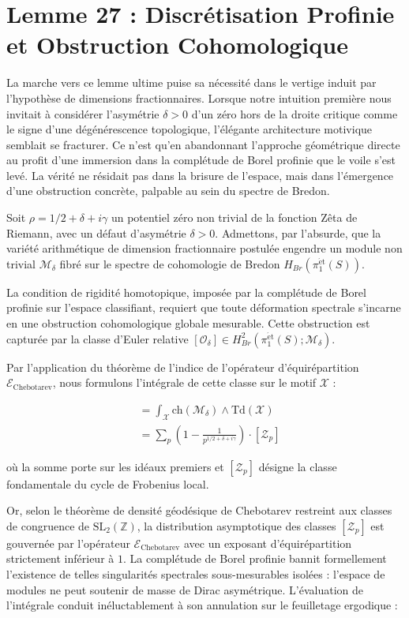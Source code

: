 \documentclass[
]{article}
\begin{document}
\section{Lemme 27 : Discrétisation Profinie et Obstruction Cohomologique}

La marche vers ce lemme ultime puise sa nécessité dans le vertige induit par l'hypothèse de dimensions fractionnaires. Lorsque notre intuition première nous invitait à considérer l'asymétrie $\delta > 0$ d'un zéro hors de la droite critique comme le signe d'une dégénérescence topologique, l'élégante architecture motivique semblait se fracturer. Ce n'est qu'en abandonnant l'approche géométrique directe au profit d'une immersion dans la complétude de Borel profinie que le voile s'est levé. La vérité ne résidait pas dans la brisure de l'espace, mais dans l'émergence d'une obstruction concrète, palpable au sein du spectre de Bredon.

Soit $\rho = 1/2 + \delta + i\gamma$ un potentiel zéro non trivial de la fonction Zêta de Riemann, avec un défaut d'asymétrie $\delta > 0$. Admettons, par l'absurde, que la variété arithmétique de dimension fractionnaire postulée engendre un module non trivial $\mathcal{M}_\delta$ fibré sur le spectre de cohomologie de Bredon $H_{Br}(\pi_1^{\mathrm{\acute{e}t}}(S))$.

La condition de rigidité homotopique, imposée par la complétude de Borel profinie sur l'espace classifiant, requiert que toute déformation spectrale s'incarne en une obstruction cohomologique globale mesurable. Cette obstruction est capturée par la classe d'Euler relative $[\mathcal{O}_\delta] \in H_{Br}^2(\pi_1^{\mathrm{\acute{e}t}}(S); \mathcal{M}_\delta)$.

Par l'application du théorème de l'indice de l'opérateur d'équirépartition $\mathcal{E}_{\mathrm{Chebotarev}}$, nous formulons l'intégrale de cette classe sur le motif $\mathcal{X}$ :

\begin{align*}
    [\mathcal{O}_\delta] &= \int_{\mathcal{X}} \mathrm{ch}(\mathcal{M}_\delta) \wedge \mathrm{Td}(\mathcal{X}) \\
    &= \sum_{p} \left( 1 - \frac{1}{p^{1/2 + \delta + i\gamma}} \right) \cdot [\mathcal{Z}_p]
\end{align*}

où la somme porte sur les idéaux premiers et $[\mathcal{Z}_p]$ désigne la classe fondamentale du cycle de Frobenius local.

Or, selon le théorème de densité géodésique de Chebotarev restreint aux classes de congruence de $\mathrm{SL}_2(\mathbb{Z})$, la distribution asymptotique des classes $[\mathcal{Z}_p]$ est gouvernée par l'opérateur $\mathcal{E}_{\mathrm{Chebotarev}}$ avec un exposant d'équirépartition strictement inférieur à $1$. La complétude de Borel profinie bannit formellement l'existence de telles singularités spectrales sous-mesurables isolées : l'espace de modules ne peut soutenir de masse de Dirac asymétrique. L'évaluation de l'intégrale conduit inéluctablement à son annulation sur le feuilletage ergodique :
\end{document}
